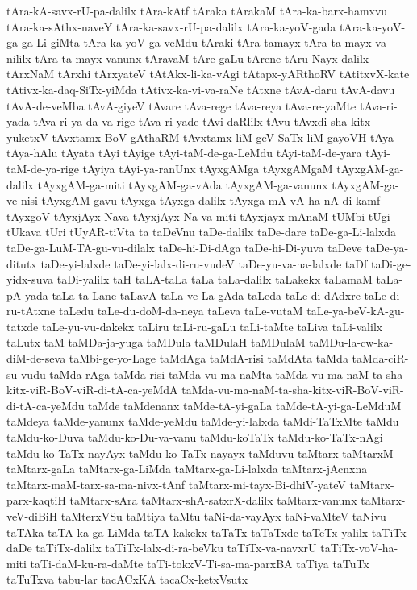 {tAra-kA-savx-rU-pa-dalilx
tAra-kAtf
tAraka
tArakaM
tAra-ka-barx-hamxvu
tAra-ka-sAthx-naveY
tAra-ka-savx-rU-pa-dalilx
tAra-ka-yoV-gada
tAra-ka-yoV-ga-ga-Li-giMta
tAra-ka-yoV-ga-veMdu
tAraki
tAra-tamayx
tAra-ta-mayx-va-nililx
tAra-ta-mayx-vanunx
tAravaM
tAre-gaLu
tArene
tAru-Nayx-dalilx
tArxNaM
tArxhi
tArxyateV
tAtAkx-li-ka-vAgi
tAtapx-yARthoRV
tAtitxvX-kate
tAtivx-ka-daq-SiTx-yiMda
tAtivx-ka-vi-va-raNe
tAtxne
tAvA-daru
tAvA-davu
tAvA-de-veMba
tAvA-giyeV
tAvare
tAva-rege
tAva-reya
tAva-re-yaMte
tAva-ri-yada
tAva-ri-ya-da-va-rige
tAva-ri-yade
tAvi-daRlilx
tAvu
tAvxdi-sha-kitx-yuketxV
tAvxtamx-BoV-gAthaRM
tAvxtamx-liM-geV-SaTx-liM-gayoVH
tAya
tAya-hAlu
tAyata
tAyi
tAyige
tAyi-taM-de-ga-LeMdu
tAyi-taM-de-yara
tAyi-taM-de-ya-rige
tAyiya
tAyi-ya-ranUnx
tAyxgAMga
tAyxgAMgaM
tAyxgAM-ga-dalilx
tAyxgAM-ga-miti
tAyxgAM-ga-vAda
tAyxgAM-ga-vanunx
tAyxgAM-ga-ve-nisi
tAyxgAM-gavu
tAyxga
tAyxga-dalilx
tAyxga-mA-vA-ha-nA-di-kamf
tAyxgoV
tAyxjAyx-Nava
tAyxjAyx-Na-va-miti
tAyxjayx-mAnaM
tUMbi
tUgi
tUkava
tUri
tUyAR-tiVta
ta
taDeVnu
taDe-dalilx
taDe-dare
taDe-ga-Li-lalxda
taDe-ga-LuM-TA-gu-vu-dilalx
taDe-hi-Di-dAga
taDe-hi-Di-yuva
taDeve
taDe-ya-ditutx
taDe-yi-lalxde
taDe-yi-lalx-di-ru-vudeV
taDe-yu-va-na-lalxde
taDf
taDi-ge-yidx-suva
taDi-yalilx
taH
taLA-taLa
taLa
taLa-dalilx
taLakekx
taLamaM
taLa-pA-yada
taLa-ta-Lane
taLavA
taLa-ve-La-gAda
taLeda
taLe-di-dAdxre
taLe-di-ru-tAtxne
taLedu
taLe-du-doM-da-neya
taLeva
taLe-vutaM
taLe-ya-beV-kA-gu-tatxde
taLe-yu-vu-dakekx
taLiru
taLi-ru-gaLu
taLi-taMte
taLiva
taLi-valilx
taLutx
taM
taMDa-ja-yuga
taMDula
taMDulaH
taMDulaM
taMDu-la-cw-ka-diM-de-seva
taMbi-ge-yo-Lage
taMdAga
taMdA-risi
taMdAta
taMda
taMda-ciR-su-vudu
taMda-rAga
taMda-risi
taMda-vu-ma-naMta
taMda-vu-ma-naM-ta-sha-kitx-viR-BoV-viR-di-tA-ca-yeMdA
taMda-vu-ma-naM-ta-sha-kitx-viR-BoV-viR-di-tA-ca-yeMdu
taMde
taMdenanx
taMde-tA-yi-gaLa
taMde-tA-yi-ga-LeMduM
taMdeya
taMde-yanunx
taMde-yeMdu
taMde-yi-lalxda
taMdi-TaTxMte
taMdu
taMdu-ko-Duva
taMdu-ko-Du-va-vanu
taMdu-koTaTx
taMdu-ko-TaTx-nAgi
taMdu-ko-TaTx-nayAyx
taMdu-ko-TaTx-nayayx
taMduvu
taMtarx
taMtarxM
taMtarx-gaLa
taMtarx-ga-LiMda
taMtarx-ga-Li-lalxda
taMtarx-jAcnxna
taMtarx-maM-tarx-sa-ma-nivx-tAnf
taMtarx-mi-tayx-Bi-dhiV-yateV
taMtarx-parx-kaqtiH
taMtarx-sAra
taMtarx-shA-satxrX-dalilx
taMtarx-vanunx
taMtarx-veV-diBiH
taMterxVSu
taMtiya
taMtu
taNi-da-vayAyx
taNi-vaMteV
taNivu
taTAka
taTA-ka-ga-LiMda
taTA-kakekx
taTaTx
taTaTxde
taTeTx-yalilx
taTiTx-daDe
taTiTx-dalilx
taTiTx-lalx-di-ra-beVku
taTiTx-va-navxrU
taTiTx-voV-ha-miti
taTi-daM-ku-ra-daMte
taTi-tokxV-Ti-sa-ma-parxBA
taTiya
taTuTx
taTuTxva
tabu-lar
tacACxKA
tacaCx-ketxVsutx
}
